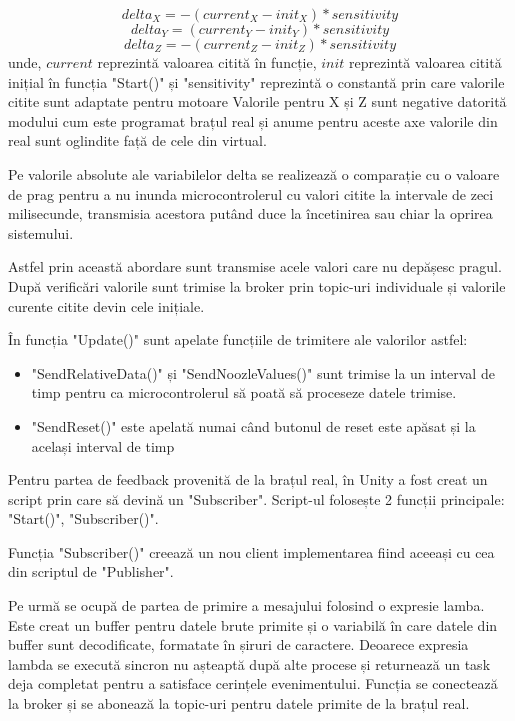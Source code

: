 \begin{equation}
	delta_X = -(current_X-init_X) * sensitivity
\end{equation}
\begin{equation}
		delta_Y = (current_Y-init_Y) * sensitivity
\end{equation}
\begin{equation}
	delta_Z = -(current_Z-init_Z) * sensitivity
\end{equation}
unde,
$current$ reprezintă valoarea citită în funcție, $init$ reprezintă valoarea citită inițial în funcția "Start()" și "sensitivity" reprezintă o constantă prin care valorile citite sunt adaptate pentru motoare
Valorile pentru X și Z sunt negative datorită modului cum este programat brațul real și anume pentru aceste axe valorile din real sunt oglindite față de cele din virtual.	

Pe valorile absolute ale variabilelor delta se realizează o comparație cu o valoare de prag pentru a nu inunda microcontrolerul cu valori citite la intervale de zeci milisecunde, transmisia acestora putând duce la încetinirea sau chiar la oprirea sistemului.

Astfel prin această abordare sunt transmise acele valori care nu depășesc pragul. După verificări valorile sunt trimise la broker prin topic-uri individuale și valorile curente citite devin cele inițiale.

În funcția "Update()" sunt apelate funcțiile de trimitere ale valorilor astfel:
\begin{itemize}
	\item "SendRelativeData()" și "SendNoozleValues()" sunt trimise  la un interval de timp pentru ca microcontrolerul să poată să proceseze datele trimise.
	\item "SendReset()" este apelată numai când butonul de reset este apăsat și la același interval de timp 
\end{itemize}

Pentru partea de feedback provenită de la brațul real, în Unity a fost creat un script prin care să devină un "Subscriber". Script-ul folosește 2 funcții principale: "Start()", "Subscriber()".

Funcția "Subscriber()" creează un nou client implementarea fiind aceeași cu cea din scriptul de "Publisher". 

Pe urmă se ocupă de partea de primire a mesajului folosind o expresie lamba. Este creat un buffer pentru datele brute primite  și o variabilă în care datele din buffer sunt decodificate, formatate în șiruri de caractere. Deoarece expresia lambda se execută sincron nu așteaptă după alte procese și returnează un task deja completat pentru a satisface cerințele evenimentului. Funcția se conectează la broker și se abonează la topic-uri pentru datele primite de la brațul real.

